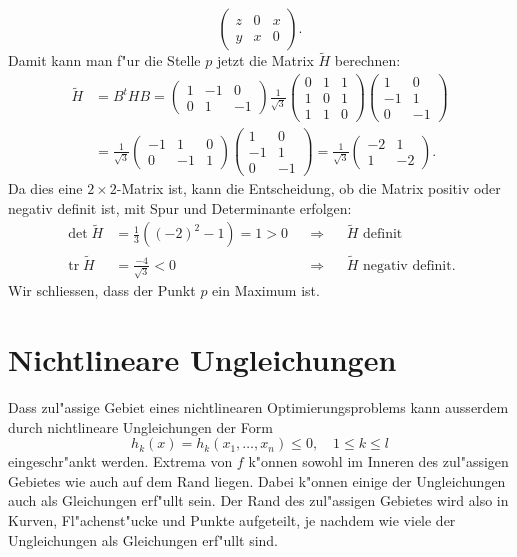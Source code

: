 \begin{beispiel}
\[\begin{pmatrix}
z&0&x\\
y&x&0
\end{pmatrix}.
\]
Damit kann man f"ur die Stelle $p$ jetzt die Matrix $\tilde H$ berechnen:
\begin{align*}
\tilde H&=B^tHB
=
\begin{pmatrix}
1&-1& 0\\
0& 1&-1
\end{pmatrix}
\frac1{\sqrt{3}}
\begin{pmatrix}
0&1&1\\
1&0&1\\
1&1&0
\end{pmatrix}
\begin{pmatrix}
 1& 0\\
-1& 1\\
 0&-1
\end{pmatrix}
\\
&
=
\frac1{\sqrt{3}}
\begin{pmatrix}
-1& 1& 0\\
 0&-1& 1
\end{pmatrix}
\begin{pmatrix}
 1& 0\\
-1& 1\\
 0&-1
\end{pmatrix}
=
\frac1{\sqrt{3}}
\begin{pmatrix}
-2& 1\\
 1&-2
\end{pmatrix}.
\end{align*}
Da dies eine $2\times 2$-Matrix ist, kann die Entscheidung, ob die
Matrix positiv oder negativ definit ist, mit Spur und Determinante
erfolgen:
\begin{align*}
\det\tilde H&=\frac13((-2)^2-1)=1>0&&\Rightarrow&&\text{$\tilde H$ definit}\\
\operatorname{tr}\tilde H&=\frac{-4}{\sqrt{3}}<0&&\Rightarrow&&\text{$\tilde H$ negativ definit.}
\end{align*}
Wir schliessen, dass der Punkt $p$ ein Maximum ist.
\end{beispiel}

\section{Nichtlineare Ungleichungen}
Dass zul"assige Gebiet eines
nichtlinearen Optimierungsproblems kann ausserdem durch 
nichtlineare Ungleichungen der Form
\begin{equation}
h_k(x) = h_k(x_1,\dots,x_n) \le 0,\quad 1 \le k\le l
\end{equation}
eingeschr"ankt werden.
Extrema von $f$ k"onnen sowohl im Inneren des zul"assigen Gebietes
wie auch auf dem Rand liegen.
Dabei k"onnen einige der Ungleichungen auch als Gleichungen erf"ullt
sein. Der Rand des zul"assigen Gebietes
wird also in Kurven, Fl"achenst"ucke und Punkte aufgeteilt, je nachdem
wie viele der Ungleichungen als Gleichungen erf"ullt sind.

